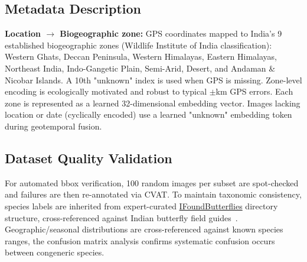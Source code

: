 \documentclass[runningheads]{llncs}
\begin{document}
\subsection{Metadata Description}
\textbf{Location $\rightarrow$ Biogeographic zone:} GPS coordinates mapped to India's 9 established biogeographic zones (Wildlife Institute of India classification): Western Ghats, Deccan Peninsula, Western Himalayas, Eastern Himalayas, Northeast India, Indo-Gangetic Plain, Semi-Arid, Desert, and Andaman \& Nicobar Islands. A 10th "unknown" index is used when GPS is missing. Zone-level encoding is ecologically motivated and robust to typical $\pm$km GPS errors. Each zone is represented as a learned 32-dimensional embedding vector.
Images lacking location or date (cyclically encoded) use a learned "unknown" embedding token during geotemporal fusion.

\subsection{Dataset Quality Validation}
For automated bbox verification, 100 random images per subset are spot-checked and failures are then re-annotated via CVAT. To maintain taxonomic consistency, species labels are inherited from expert-curated \href{https://www.ifoundbutterflies.org}{IFoundButterflies} directory structure, cross-referenced against Indian butterfly field guides~\cite{kehimkar2016butterflies}. Geographic/seasonal distributions are cross-referenced against known species ranges, the confusion matrix analysis confirms systematic confusion occurs between congeneric species.
\end{document}
